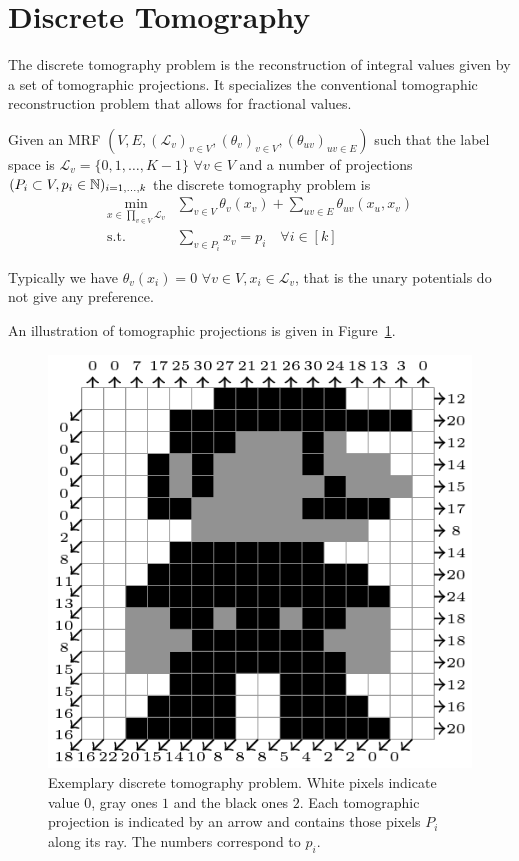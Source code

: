 \section{Discrete Tomography}

The discrete tomography problem is the reconstruction of integral values given by a set of tomographic projections.
It specializes the conventional tomographic reconstruction problem that allows for fractional values.

\begin{definition}
Given an MRF $(V,E,(\mathcal{L}_v)_{v \in V},(\theta_v)_{v \in V}, (\theta_{uv})_{uv \in E})$ such that the label space is $\mathcal{L}_v = \{0,1,\ldots,K-1\}$ $\forall v \in V$ and a number of projections
$(P_i \subset V, p_i \in \mathbb{N})_{i=1,\ldots,k}$ the discrete tomography problem is
\begin{equation}
\begin{array}{rl}
\min\limits_{x \in \prod_{v \in V} \mathcal{L}_v} & \sum\limits_{v \in V} \theta_v(x_v) + \sum\limits_{uv \in E} \theta_{uv}(x_u,x_v) \\
\text{s.t.}
& \sum\limits_{v \in P_i} x_v = p_i \quad \forall i \in [k]
\end{array}
\end{equation}
\end{definition}
Typically we have $\theta_v(x_i) = 0$ $\forall v \in V, x_i \in \mathcal{L}_v$, that is the unary potentials do not give any preference.

An illustration of tomographic projections is given in Figure~\ref{fig:discrete-tomo}.

\begin{figure}[H]
\begin{center}
\includegraphics[width=0.7\columnwidth]{images/discrete-tomo-example.png}
\end{center}
\caption{
Exemplary discrete tomography problem.
White pixels indicate value $0$, gray ones $1$ and the black ones $2$.
Each tomographic projection is indicated by an arrow and contains those pixels $P_i$ along its ray. The numbers correspond to $p_i$.
}
\label{fig:discrete-tomo}
\end{figure}

